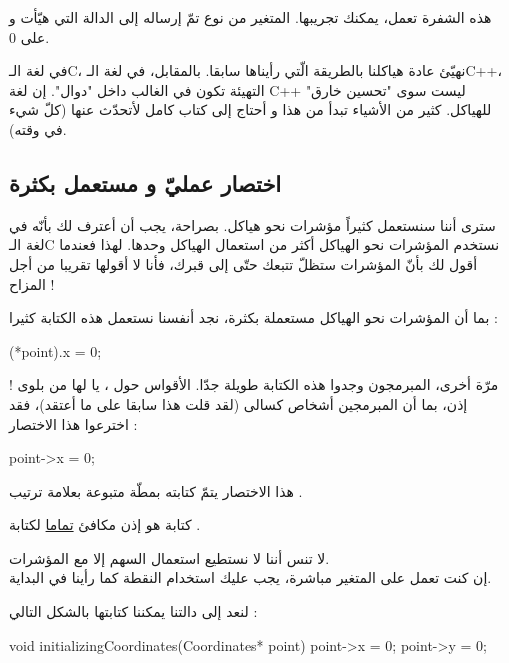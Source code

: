 هذه الشفرة تعمل، يمكنك تجريبها. المتغير من نوع
تمّ إرساله إلى الدالة التي هيّأت
و
على 0.

\begin{information}
في لغة الـ\textenglish{C}،
نهيّئ عادة هياكلنا بالطريقة الّتي رأيناها سابقا. بالمقابل، في لغة الـ\textenglish{C++}،
التهيئة تكون في الغالب داخل "دوال".
إن لغة
\textenglish{C++}
ليست سوى "تحسين خارق" للهياكل. كثير من الأشياء تبدأ من هذا و أحتاج إلى كتاب كامل لأتحدّث عنها (كلّ شيء في وقته).
\end{information}

\subsection{اختصار عمليّ و مستعمل بكثرة}

سترى أننا سنستعمل كثيراً مؤشرات نحو هياكل. بصراحة، يجب أن أعترف لك بأنّه
في لغة الـ\textenglish{C}
نستخدم  المؤشرات نحو الهياكل أكثر من استعمال الهياكل وحدها. لهذا فعندما أقول لك بأنّ المؤشرات ستظلّ تتبعك حتّى إلى قبرك، فأنا لا أقولها تقريبا من أجل المزاح !

بما أن المؤشرات نحو الهياكل مستعملة بكثرة، نجد أنفسنا نستعمل هذه الكتابة كثيرا :
\begin{Csource}
(*point).x = 0;
\end{Csource}

مرّة أخرى، المبرمجون وجدوا هذه الكتابة طويلة جدّا. الأقواس حول
،
يا لها من بلوى ! إذن، بما أن المبرمجين أشخاص كسالى (لقد قلت هذا سابقا على ما أعتقد)، فقد اخترعوا هذا الاختصار :

\begin{Csource}
point->x = 0;
\end{Csource}

هذا الاختصار يتمّ كتابته بمطّة
\InlineCode{-}
متبوعة بعلامة ترتيب
\InlineCode{>}.

كتابة
هو إذن مكافئ
\underline{تماما}
لكتابة
.

\begin{warning}
  لا تنس أننا لا نستطيع استعمال السهم إلا مع المؤشرات.\\
إن كنت تعمل على المتغير مباشرة، يجب عليك استخدام النقطة كما رأينا في البداية.
\end{warning}

لنعد إلى دالتنا
يمكننا كتابتها بالشكل التالي :

\begin{Csource}
void initializingCoordinates(Coordinates* point)
{
	point->x = 0;
	point->y = 0;
}
\end{Csource}

